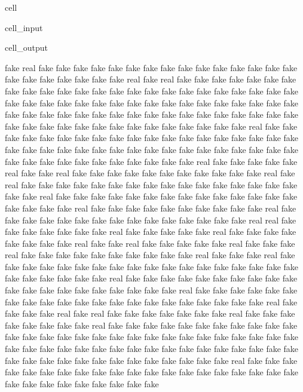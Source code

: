 \documentclass[letterpaper,10pt,brazil]{sphinxmanual}
\begin{document}
\begin{sphinxuseclass}{cell}
\begin{sphinxuseclass}{cell_input}
\end{sphinxuseclass}
\begin{sphinxuseclass}{cell_output}
\begin{sphinxVerbatim}[commandchars=\\\{\}]
fake
real
fake
fake
fake
fake
fake
fake
fake
fake
fake
fake
fake
fake
fake
fake
fake
fake
fake
fake
fake
fake
fake
fake
real
fake
real
fake
fake
fake
fake
fake
fake
fake
fake
fake
fake
fake
fake
fake
fake
fake
fake
fake
fake
fake
fake
fake
fake
fake
fake
fake
fake
fake
fake
fake
fake
fake
fake
fake
fake
fake
fake
fake
fake
fake
fake
fake
fake
fake
fake
fake
fake
fake
fake
fake
fake
fake
fake
fake
fake
fake
fake
fake
fake
fake
fake
fake
fake
fake
fake
fake
fake
fake
fake
fake
fake
fake
fake
real
fake
fake
fake
fake
fake
fake
fake
fake
fake
fake
fake
fake
fake
fake
fake
fake
fake
fake
fake
fake
fake
fake
fake
fake
fake
fake
fake
fake
fake
fake
fake
fake
fake
fake
fake
fake
fake
fake
fake
fake
fake
fake
fake
fake
fake
fake
fake
real
fake
fake
fake
fake
fake
real
fake
fake
real
fake
fake
fake
fake
fake
fake
fake
fake
fake
fake
fake
real
fake
real
fake
fake
fake
fake
fake
fake
fake
fake
fake
fake
fake
fake
fake
fake
fake
fake
fake
fake
real
fake
fake
fake
fake
fake
fake
fake
fake
fake
fake
fake
fake
fake
fake
fake
fake
fake
fake
real
fake
fake
fake
fake
fake
fake
fake
fake
fake
fake
real
fake
fake
fake
fake
fake
fake
fake
fake
fake
fake
fake
fake
fake
fake
fake
real
real
fake
fake
fake
fake
fake
fake
fake
real
fake
fake
fake
fake
fake
real
fake
fake
fake
fake
fake
fake
fake
fake
real
fake
fake
real
fake
fake
fake
fake
fake
real
fake
fake
fake
real
fake
fake
fake
fake
fake
fake
fake
fake
fake
fake
real
fake
fake
fake
real
fake
fake
fake
fake
fake
fake
fake
fake
fake
fake
fake
fake
fake
fake
fake
fake
fake
fake
fake
fake
fake
fake
fake
fake
real
fake
fake
fake
fake
fake
fake
fake
fake
fake
fake
fake
fake
fake
fake
fake
fake
fake
fake
fake
fake
real
fake
fake
fake
fake
fake
fake
fake
fake
fake
fake
fake
fake
fake
fake
fake
fake
fake
fake
fake
fake
fake
real
fake
fake
fake
fake
real
fake
real
fake
fake
fake
fake
fake
fake
fake
real
fake
fake
fake
fake
fake
fake
fake
fake
real
fake
fake
fake
fake
fake
fake
fake
fake
fake
fake
fake
fake
fake
fake
fake
fake
fake
fake
fake
fake
fake
fake
fake
fake
fake
fake
fake
fake
fake
fake
fake
fake
fake
fake
fake
fake
fake
fake
fake
fake
fake
fake
fake
fake
fake
fake
fake
fake
fake
fake
fake
fake
fake
fake
fake
fake
fake
fake
real
fake
fake
fake
fake
fake
fake
fake
fake
fake
fake
fake
fake
fake
fake
fake
fake
fake
fake
fake
fake
fake
fake
fake
fake
fake
fake
fake
fake
fake

\end{sphinxVerbatim}
\end{sphinxuseclass}
\end{sphinxuseclass}
\end{document}
